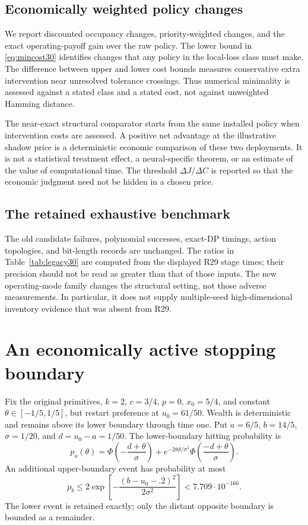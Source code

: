 \subsection{Economically weighted policy changes}

We report discounted occupancy changes, priority-weighted changes, and the exact operating-payoff gain over the raw policy. The lower bound in \eqref{eq:mincost30} identifies changes that any policy in the local-loss class must make. The difference between upper and lower cost bounds measures conservative extra intervention near unresolved tolerance crossings. Thus numerical minimality is assessed against a stated class and a stated cost, not against unweighted Hamming distance.

The near-exact structural comparator starts from the same installed policy when intervention costs are assessed. A positive net advantage at the illustrative shadow price is a deterministic economic comparison of these two deployments. It is not a statistical treatment effect, a neural-specific theorem, or an estimate of the value of computational time. The threshold $\Delta J/\Delta C$ is reported so that the economic judgment need not be hidden in a chosen price.

\subsection{The retained exhaustive benchmark}

The old candidate failures, polynomial successes, exact-DP timings, action topologies, and bit-length records are unchanged. The ratios in Table~\ref{tab:legacy30} are computed from the displayed R29 stage times; their precision should not be read as greater than that of those inputs. The new operating-mode family changes the structural setting, not those adverse measurements. In particular, it does not supply multiple-seed high-dimensional inventory evidence that was absent from R29.

\section{An economically active stopping boundary}\label{sec:stopping30}
Fix the original primitives, $k=2$, $c=3/4$, $p=0$, $x_0=5/4$, and constant $\theta\in[-1/5,1/5]$, but restart preference at $u_0=61/50$. Wealth is deterministic and remains above its lower boundary through time one. Put $a=6/5$, $b=14/5$, $\sigma=1/20$, and $d=u_0-a=1/50$. The lower-boundary hitting probability is
\begin{equation}\label{eq:hit30}
 p_a(\theta)=\Phi\!\left(-\frac{d+\theta}{\sigma}\right)
 +e^{-2\theta d/\sigma^2}\Phi\!\left(\frac{-d+\theta}{\sigma}\right).
\end{equation}
An additional upper-boundary event has probability at most
\begin{equation}
 p_b\le 2\exp\!\left[-\frac{(b-u_0-.2)^2}{2\sigma^2}\right]
 <7.709\cdot10^{-166}.
\end{equation}
The lower event is retained exactly; only the distant opposite boundary is bounded as a remainder.

